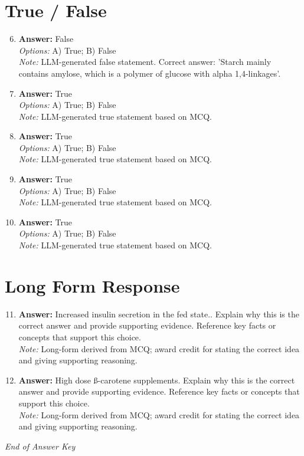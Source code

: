 \documentclass[12pt]{article}
\begin{document}
\section*{True / False}
\begin{enumerate}[label=\arabic*.]
\setcounter{enumi}{5}
\item \textbf{Answer:} False
\\ \textit{Options:} A) True; B) False
\\ \textit{Note:} LLM-generated false statement. Correct answer: 'Starch mainly contains amylose, which is a polymer of glucose with alpha 1,4-linkages'.
\item \textbf{Answer:} True
\\ \textit{Options:} A) True; B) False
\\ \textit{Note:} LLM-generated true statement based on MCQ.
\item \textbf{Answer:} True
\\ \textit{Options:} A) True; B) False
\\ \textit{Note:} LLM-generated true statement based on MCQ.
\item \textbf{Answer:} True
\\ \textit{Options:} A) True; B) False
\\ \textit{Note:} LLM-generated true statement based on MCQ.
\item \textbf{Answer:} True
\\ \textit{Options:} A) True; B) False
\\ \textit{Note:} LLM-generated true statement based on MCQ.
\end{enumerate}

\section*{Long Form Response}
\begin{enumerate}[label=\arabic*.]
\setcounter{enumi}{10}
\item \textbf{Answer:} Increased insulin secretion in the fed state.. Explain why this is the correct answer and provide supporting evidence. Reference key facts or concepts that support this choice.
\\ \textit{Note:} Long-form derived from MCQ; award credit for stating the correct idea and giving supporting reasoning.
\item \textbf{Answer:} High dose ß-carotene supplements. Explain why this is the correct answer and provide supporting evidence. Reference key facts or concepts that support this choice.
\\ \textit{Note:} Long-form derived from MCQ; award credit for stating the correct idea and giving supporting reasoning.
\end{enumerate}

\vfill
\noindent\textit{End of Answer Key}
\end{document}
